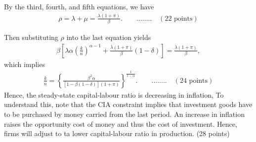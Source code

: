 \documentclass[12pt]{article}
\begin{document}
By the third, fourth, and fifth equations, we have
\begin{align*}
    \rho = \lambda + \mu = \frac{\lambda(1+\pi)}{\beta}. \qquad ........ \quad(22 \text{ points})
\end{align*}

Then substituting $\rho$ into the last equation yields
\begin{align*}
    \beta \left[\lambda \alpha \left(\frac{k}{n}\right)^{\alpha-1} + \frac{\lambda(1+\pi)}{\beta}(1-\delta)\right] = \frac{\lambda(1+\pi)}{\beta},
\end{align*}
which implies
\begin{align*}
    \frac{k}{n} = \left\{\frac{\beta^2 \alpha}{[1-\beta(1-\delta)](1+\pi)}\right\}^{\frac{1}{1-\alpha}}. \qquad ........ \quad(24 \text{ points})
\end{align*}
Hence, the steady-state capital-labour ratio is decreasing in inflation, To understand this, note that the CIA constraint implies that investment goods have to be purchased by money carried from the last period. An increase in inflation raises the opportunity cost of money and thus the cost of investment. Hence, firms will adjust to ta lower capital-labour ratio in production. (28 points)

\newpage
\end{document}
